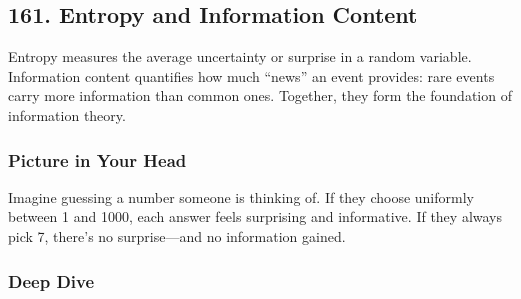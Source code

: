 \documentclass[
  letterpaper,
  DIV=11,
  numbers=noendperiod]{scrreprt}
\begin{document}
\subsection{161. Entropy and Information
Content}\label{entropy-and-information-content}

Entropy measures the average uncertainty or surprise in a random
variable. Information content quantifies how much ``news'' an event
provides: rare events carry more information than common ones. Together,
they form the foundation of information theory.

\subsubsection{Picture in Your Head}\label{picture-in-your-head-160}

Imagine guessing a number someone is thinking of. If they choose
uniformly between 1 and 1000, each answer feels surprising and
informative. If they always pick 7, there's no surprise---and no
information gained.

\subsubsection{Deep Dive}\label{deep-dive-160}
\end{document}
